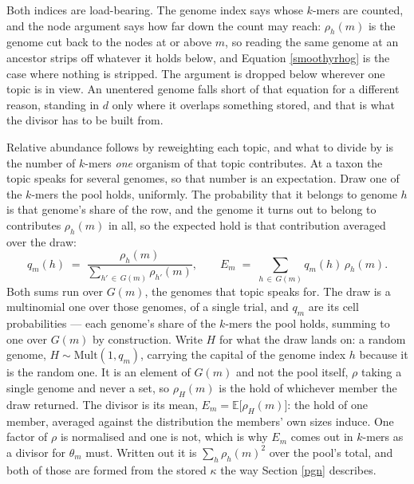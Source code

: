 \documentclass[pdflatex,sn-vancouver-num]{sn-jnl}
\begin{document}
    Both indices are load-bearing. The genome index says whose $k$-mers are counted, and the node
    argument says how far down the count may reach: $\rho_h(m)$ is the genome cut back to the nodes
    at or above $m$, so reading the same genome at an ancestor strips off whatever it holds below,
    and Equation \eqref{smoothyrhog} is the case where nothing is stripped. The argument is dropped
    below wherever one topic is in view. An unentered genome falls short of that equation for a
    different reason, standing in $d$ only where it overlaps something stored, and that is what the
    divisor has to be built from.

    Relative abundance follows by reweighting each topic, and what to divide by is the number of
    $k$-mers \emph{one} organism of that topic contributes. At a taxon the topic speaks for
    several genomes, so that number is an expectation. Draw one of the $k$-mers the pool holds,
    uniformly. The probability that it belongs to genome $h$ is that genome's share of the row, and
    the genome it turns out to belong to contributes $\rho_h(m)$ in all, so the expected hold is
    that contribution averaged over the draw:
    \begin{equation}\label{smoothyhold}
        q_m(h) \;=\; \frac{\rho_h(m)}{\sum_{h' \,\in\, G(m)} \rho_{h'}(m)} ,
        \qquad
        E_m \;=\; \sum_{h \,\in\, G(m)} q_m(h) \, \rho_h(m) .
    \end{equation}
    Both sums run over $G(m)$, the genomes that topic speaks for. The draw is a multinomial one over
    those genomes, of a single trial, and $q_m$ are its cell probabilities --- each genome's share of
    the $k$-mers the pool holds, summing to one over $G(m)$ by construction. Write $H$ for what the
    draw lands on: a random genome, $H \sim \mathrm{Mult}(1, q_m)$, carrying the capital of the
    genome index $h$ because it is the random one. It is an element of $G(m)$ and not the pool
    itself, $\rho$ taking a single genome and never a set, so $\rho_H(m)$ is the hold of whichever
    member the draw returned. The divisor is its mean,
    $E_m = \mathbb{E}\bigl[ \rho_H(m) \bigr]$: the hold of one member, averaged against the
    distribution the members' own sizes induce. One factor of $\rho$ is normalised and one is not,
    which is why $E_m$ comes out in $k$-mers as a divisor for $\theta_m$ must. Written out it is
    $\sum_h \rho_h(m)^{2}$ over the pool's total, and both of those are formed from the stored
    $\kappa$ the way Section \ref{pgn} describes.
\end{document}
